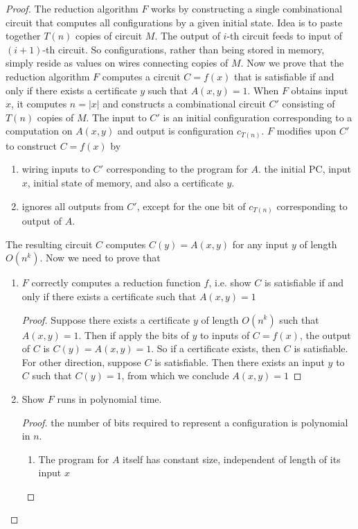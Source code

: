 \documentclass[11pt]{article}
\begin{document}
\begin{lemma*}
\begin{proof}
        The reduction algorithm $F$ works by constructing a single combinational circuit that computes all configurations by a given initial state. Idea is to paste together $T(n)$ copies of circuit $M$. The output of $i$-th circuit feeds to input of $(i+1)$-th circuit. So configurations, rather than being stored in memory, simply reside as values on wires connecting copies of $M$. Now we prove that the reduction algorithm $F$ computes a circuit $C = f(x)$ that is satisfiable if and only if there exists a certificate $y$ such that $A(x,y) = 1$. When $F$ obtains input $x$, it computes $n=|x|$ and constructs a combinational circuit $C'$ consisting of $T(n)$ copies of $M$. The input to $C'$ is an initial configuration corresponding to a computation on $A(x,y)$ and output is configuration $c_{T(n)}$. $F$ modifies upon $C'$ to construct $C = f(x)$ by 
        \begin{enumerate}
            \item wiring inputs to $C'$ corresponding to the program for $A$. the initial PC, input $x$, initial state of memory, and also a certificate $y$. 
            \item ignores all outputs from $C'$, except for the one bit of $c_{T(n)}$ corresponding to output of $A$. 
        \end{enumerate}
        The resulting circuit $C$ computes $C(y) = A(x,y)$ for any input $y$ of length $O(n^k)$. Now we need to prove that 
        \begin{enumerate}
            \item $F$ correctly computes a reduction function $f$, i.e. show $C$ is satisfiable if and only if there exists a certificate such that $A(x,y)=1$
            \begin{proof}
                Suppose there exists a certificate $y$ of length $O(n^k)$ such that $A(x,y)=1$. Then if apply the bits of $y$ to inputs of $C = f(x)$, the output of $C$ is $C(y) = A(x,y) = 1$. So if a certificate exists, then $C$ is satisfiable. For other direction, suppose $C$ is satisfiable. Then there exists an input $y$ to $C$ such that $C(y) = 1$, from which we conclude $A(x,y)=1$
            \end{proof}
            \item Show $F$ runs in polynomial time.
            \begin{proof}
                the number of bits required to represent a configuration is polynomial in $n$. 
                \begin{enumerate}
                    \item The program for $A$ itself has constant size, independent of length of its input $x$

\end{enumerate}
\end{proof}
\end{enumerate}
\end{proof}
\end{lemma*}
\end{document}
